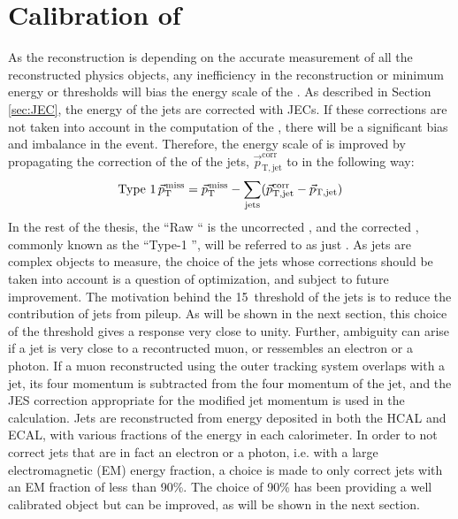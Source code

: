 \section{Calibration of \ptmiss} 
\noindent
\justify
\label{sec:metcorrections}
As the \ptmiss reconstruction is depending on the accurate measurement of all the reconstructed physics objects, any inefficiency in the reconstruction or minimum energy or \pt thresholds will bias the energy scale of the \ptmiss. 
As described in Section \ref{sec:JEC}, the energy of the jets are corrected with JECs. 
If these corrections are not taken into account in the computation of the \ptmiss, there will be a significant bias and imbalance in the event. 
Therefore, the energy scale of \ptmiss is improved by propagating the correction of the \pt of the jets, $\vec{p}_\mathrm{T,jet}^\mathrm{corr}$ to \ptmiss in the following way:
\begin{equation}
\text{Type 1} \, {\vec p}_{\mathrm{T}}^{\kern1pt\text{miss}}
={\vec p}_{\mathrm{T}}^{\kern1pt\text{miss}} - \sum_\mathrm{jets} (\vec{p}_\mathrm{T,jet}^\mathrm{corr}-\vec{p}_\mathrm{T,jet})
\label{eq:Type1MET}
\end{equation}                                                                          
In the rest of the thesis, the ``Raw \ptmiss`` is the uncorrected \ptmiss, and the corrected \ptmiss, commonly known as the ``Type-1 \ptmiss'', will be referred to as just \ptmiss.
As jets are complex objects to measure, the choice of the jets whose corrections should be taken into account is a question of optimization, and subject to future improvement. 
The motivation behind the 15~\GeV \pt threshold of the jets is to reduce the contribution of jets from pileup. 
As will be shown in the next section, this choice of the \pt threshold gives a response very close to unity. 
Further, ambiguity can arise if a jet is very close to a recontructed muon, or ressembles an electron or a photon. 
If a muon reconstructed using the outer tracking system overlaps with a jet, its four momentum is subtracted from the four momentum of the jet, and the JES correction appropriate for the modified jet momentum is used in the \ptmiss calculation. 
Jets are reconstructed from energy deposited in both the HCAL and ECAL, with various fractions of the energy in each calorimeter. 
In order to not correct jets that are in fact an electron or a photon, i.e. with a large electromagnetic (EM) energy fraction, a choice is made to only correct jets with an EM fraction of less than 90\%. 
The choice of 90\% has been providing a well calibrated \ptmiss object but can be improved, as will be shown in the next section.  
